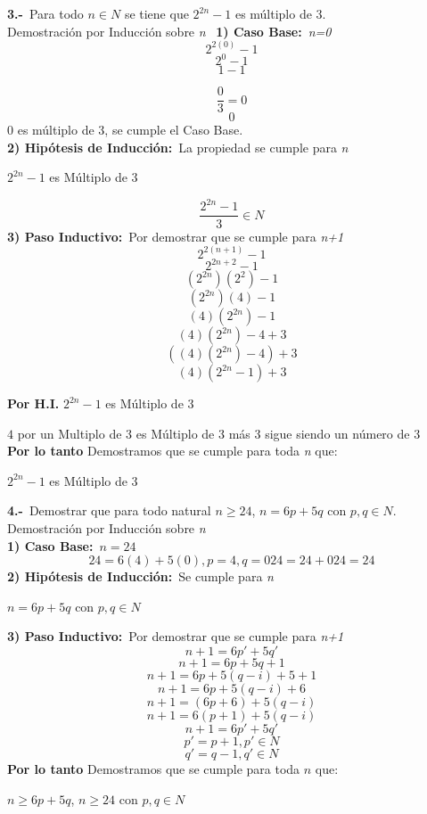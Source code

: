\documentclass{article}
\begin{document}
\newpage
\textbf{3.-}\ Para todo $n \in N$ se tiene que $2^{2n} -1 $ es múltiplo de $3$.\\
\newline
Demostración por Inducción sobre \textit{n}\
\newline
\textbf{1) Caso Base:}\ \textit{n=0}\
\[
2^{2(0)}-1
\]
\[
2^{0}-1
\]
\[
1-1
\]

\[
\frac{0}{3} = 0
\]
\[
0
\]
\newline
$0$ es múltiplo de 3, se cumple el Caso Base.\\
\newline
\textbf{2) Hipótesis de Inducción:}\  La propiedad se cumple para \textit{n}\
\begin{center}
$2^{2n}-1$ es Múltiplo de 3
\end{center}
\[
\frac{2^{2n} - 1}{3} \in N
\]
\textbf{3) Paso Inductivo:}\  Por demostrar que se cumple para \textit{n+1}\
\[
2^{2(n+1)} - 1
\]
\[
2^{2n+2} -1
\]
\[
(2^{2n})(2^{2}) - 1
\]
\[
(2^{2n})(4) - 1 
\]
\[
(4)(2^{2n}) - 1
\]
\[
(4)(2^{2n}) - 4 + 3
\]
\[
((4)(2^{2n}) - 4) +3
\]
\[
(4)(2^{2n}-1) + 3
\]
\begin{center}
\textbf{Por H.I.} $2^{2n}-1$ es Múltiplo de 3
\end{center}
$4$ por un Multiplo de 3 es Múltiplo de 3 más 3 sigue siendo un número de 3\\
\newline
\textbf{Por lo tanto} Demostramos que se cumple para toda \textit{n} que: 
\begin{center}
$2^{2n}-1$ es Múltiplo de 3
\end{center}


\newpage
\textbf{4.-}\ Demostrar que para todo natural $n \geq 24$, $n = 6p +5q$ con $p,q \in N$.\\
\newline
Demostración por Inducción sobre \textit{n}\\
\newline
\textbf{1) Caso Base:}\ $n = 24$
\[
24 = 6(4) + 5(0), p=4, q=0
24 = 24 + 0
24 = 24
\]
\textbf{2) Hipótesis de Inducción:}\  Se cumple para \textit{n}\
\begin{center}
$n = 6p +5q$ con $p,q \in N$
\end{center}
\textbf{3) Paso Inductivo:}\  Por demostrar que se cumple para \textit{n+1}\
\[
n+1 = 6p' + 5q'
\]
\[
n+1 = 6p + 5q +1
\]
\[
n+1 = 6p + 5(q-i) +5 +1
\]
\[
n+1 = 6p + 5(q-i) +6
\]
\[
n+1 = (6p + 6) + 5(q-i) 
\]
\[
n+1 = 6(p+1) + 5(q-i) 
\]
\[
n+1 = 6p' + 5q'
\]
\[
p' = p+1 ,  p' \in N
\]
\[
q' = q-1 ,  q' \in N
\]
\textbf{Por lo tanto} Demostramos que se cumple para toda $n$ que:
\begin{center}
$n \geq 6p +5q $, $n \geq 24$  con $ p,q \in N$
\end{center}
\end{document}
